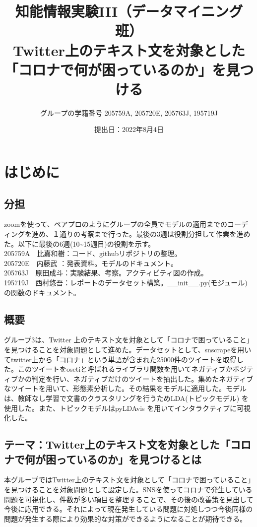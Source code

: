 \documentclass[a4paper, 11pt, titlepage]{jsarticle}
\title{知能情報実験III（データマイニング班）\\Twitter上のテキスト文を対象とした「コロナで何が困っているのか」を見つける}
\author{グループの学籍番号 205759A, 205720E, 205763J, 195719J}
\date{提出日：2022年8月4日}
\begin{document}
\maketitle
\tableofcontents
\clearpage

\section{はじめに}

\subsection{分担}
zoomを使って、ペアプロのようにグループの全員でモデルの適用までのコーディングを進め、１通りの考察まで行った。最後の3週は役割分担して作業を進めた。以下に最後の6週(10\textasciitilde15週目)の役割を示す。\\
205759A　比嘉和樹：コード、githubリポジトリの整理。\\
205720E　内藤武   ：発表資料。モデルのドキュメント。\\
205763J　原田成斗：実験結果、考察。アクティビティ図の作成。\\
195719J　西村悠吾：レポートのデータセット構築。\_\_init\_\_.py(モジュール)の関数のドキュメント。\\


\subsection{概要}
グループ3は、Twitter 上のテキスト文を対象として「コロナで困っていること」を見つけることを対象問題として進めた。データセットとして、snscrapeを用いてtwitter上から「コロナ」という単語が含まれた25000件のツイートを取得した。このツイートをosetiと呼ばれるライブラリ関数を用いてネガティブかポジティブかの判定を行い、ネガティブだけのツイートを抽出した。集めたネガティブなツイートを用いて、形態素分析した。その結果をモデルに適用した。モデルは、教師なし学習で文書のクラスタリングを行うためLDA(トピックモデル) を使用した。また、トピックモデルはpyLDAvis を用いてインタラクティブに可視化した。

\subsection{テーマ：Twitter上のテキスト文を対象とした「コロナで何が困っているのか」を見つけるとは}
本グループではTwitter上のテキスト文を対象として「コロナで困っていること」を見つけることを対象問題として設定した。SNSを使ってコロナで発生している問題を可視化し、件数が多い項目を整理することで、その後の改善策を見出して今後に応用できる。それによって現在発生している問題に対処しつつ今後同様の問題が発生する際により効果的な対策ができるようになることが期待できる。
\end{document}
